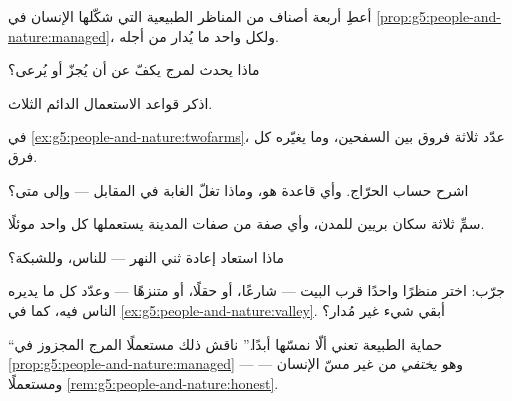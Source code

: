 \begin{exercise}[$\star$]\label{exo:g5:people-and-nature:1}
أعطِ أربعة أصناف من المناظر الطبيعية التي شكّلها الإنسان في
\cref{prop:g5:people-and-nature:managed}، ولكل واحد ما يُدار من
أجله.
\end{exercise}

\begin{exercise}[$\star$]\label{exo:g5:people-and-nature:2}
ماذا يحدث لمرج يكفّ عن أن يُجزّ أو يُرعى؟
\end{exercise}

\begin{exercise}[$\star$]\label{exo:g5:people-and-nature:3}
اذكر قواعد الاستعمال الدائم الثلاث.
\end{exercise}

\begin{exercise}[$\star$]\label{exo:g5:people-and-nature:4}
في \cref{ex:g5:people-and-nature:twofarms}، عدّد ثلاثة فروق بين
السفحين، وما يغيّره كل فرق.
\end{exercise}

\begin{exercise}[$\star$]\label{exo:g5:people-and-nature:5}
اشرح حساب الحرّاج. وأي قاعدة هو، وماذا تغلّ الغابة في المقابل ---
وإلى متى؟
\end{exercise}

\begin{exercise}[$\star$]\label{exo:g5:people-and-nature:6}
سمِّ ثلاثة سكان بريين للمدن، وأي صفة من صفات المدينة يستعملها كل
واحد موئلًا.
\end{exercise}

\begin{exercise}[$\star$]\label{exo:g5:people-and-nature:7}
ماذا استعاد إعادة ثني النهر --- للناس، وللشبكة؟
\end{exercise}

\begin{exercise}[$\star$]\label{exo:g5:people-and-nature:8}
جرّب: اختر منظرًا واحدًا قرب البيت --- شارعًا، أو حقلًا، أو متنزهًا
--- وعدّد كل ما يديره الناس فيه، كما في
\cref{ex:g5:people-and-nature:valley}. أبقي شيء غير مُدار؟
\end{exercise}

\begin{exercise}[$\star\star$]\label{exo:g5:people-and-nature:9}
``حماية الطبيعة تعني ألّا نمسّها أبدًا.'' ناقش ذلك مستعملًا المرج
المجزوز في \cref{prop:g5:people-and-nature:managed} --- وهو 
\emph{يختفي} من غير مسّ الإنسان --- ومستعملًا
\cref{rem:g5:people-and-nature:honest}.
\end{exercise}

